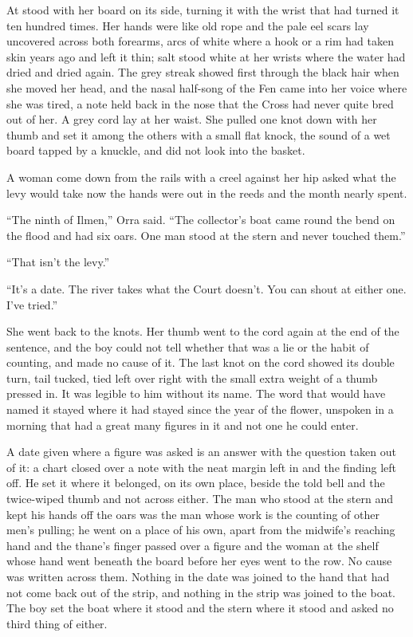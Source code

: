 At   stood with her board on its side, turning it with the wrist that had turned it ten hundred times. Her hands were like old rope and the pale eel scars lay uncovered across both forearms, arcs of white where a hook or a rim had taken skin years ago and left it thin; salt stood white at her wrists where the water had dried and dried again. The grey streak showed first through the black hair when she moved her head, and the nasal half-song of the Fen came into her voice where she was tired, a note held back in the nose that the Cross had never quite bred out of her. A grey cord lay at her waist. She pulled one knot down with her thumb and set it among the others with a small flat knock, the sound of a wet board tapped by a knuckle, and did not look into the basket.

A woman come down from the rails with a creel against her hip asked what the levy would take now the hands were out in the reeds and the month nearly spent.

“The ninth of Ilmen,” Orra said. “The collector's boat came round the bend on the flood and had six oars. One man stood at the stern and never touched them.”

“That isn't the levy.”

“It's a date. The river takes what the Court doesn't. You can shout at either one. I've tried.”

She went back to the knots. Her thumb went to the cord again at the end of the sentence, and the boy could not tell whether that was a lie or the habit of counting, and made no cause of it. The last knot on the cord showed its double turn, tail tucked, tied left over right with the small extra weight of a thumb pressed in. It was legible to him without its name. The word that would have named it stayed where it had stayed since the year of the flower, unspoken in a morning that had a great many figures in it and not one he could enter.

A date given where a figure was asked is an answer with the question taken out of it: a chart closed over a note with the neat margin left in and the finding left off. He set it where it belonged, on its own place, beside the told bell and the twice-wiped thumb and not across either. The man who stood at the stern and kept his hands off the oars was the man whose work is the counting of other men's pulling; he went on a place of his own, apart from the midwife's reaching hand and the thane's finger passed over a figure and the woman at the shelf whose hand went beneath the board before her eyes went to the row. No cause was written across them. Nothing in the date was joined to the hand that had not come back out of the strip, and nothing in the strip was joined to the boat. The boy set the boat where it stood and the stern where it stood and asked no third thing of either.

